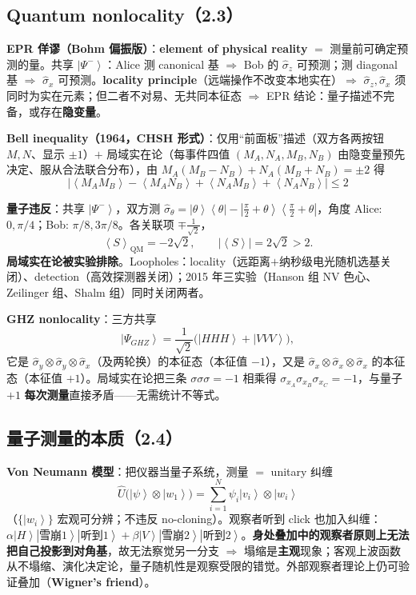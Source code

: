 \documentclass[11pt]{ctexart}
\newcommand{\ket}[1]{\left|#1\right\rangle}
\newcommand{\bra}[1]{\left\langle#1\right|}
\newcommand{\ev}[1]{\left\langle#1\right\rangle}
\newcommand{\op}[1]{\hat{#1}}
\begin{document}
\subsection{Quantum nonlocality（2.3）}

\textbf{EPR 佯谬（Bohm 偏振版）}：\textbf{element of physical reality} $=$ 测量前可确定预测的量。共享 $\ket{\Psi^-}$：Alice 测 canonical 基 $\Rightarrow$ Bob 的 $\op\sigma_z$ 可预测；测 diagonal 基 $\Rightarrow$ $\op\sigma_x$ 可预测。\textbf{locality principle}（远端操作不改变本地实在）$\Rightarrow$ $\op\sigma_z,\op\sigma_x$ 须同时为实在元素；但二者不对易、无共同本征态 $\Rightarrow$ EPR 结论：量子描述不完备，或存在\textbf{隐变量}。

\textbf{Bell inequality（1964，CHSH 形式）}：仅用``前面板''描述（双方各两按钮 $M,N$、显示 $\pm1$）$+$ 局域实在论（每事件四值 $(M_A,N_A,M_B,N_B)$ 由隐变量预先决定、服从合法联合分布），由 $M_A(M_B-N_B)+N_A(M_B+N_B)=\pm2$ 得
\[
\boxed{\;\big|\ev{M_AM_B}-\ev{M_AN_B}+\ev{N_AM_B}+\ev{N_AN_B}\big|\le2\;}
\]

\textbf{量子违反}：共享 $\ket{\Psi^-}$，双方测 $\op\sigma_\theta=\ket\theta\bra\theta-\ket{\tfrac\pi2+\theta}\bra{\tfrac\pi2+\theta}$，角度 Alice: $0,\pi/4$；Bob: $\pi/8,3\pi/8$。各关联项 $\mp\tfrac{1}{\sqrt2}$，
\[
\ev S_{\mathrm{QM}}=-2\sqrt2,\qquad |\ev S|=2\sqrt2>2.
\]
\textbf{局域实在论被实验排除}。Loopholes：locality（远距离$+$纳秒级电光随机选基关闭）、detection（高效探测器关闭）；2015 年三实验（Hanson 组 NV 色心、Zeilinger 组、Shalm 组）同时关闭两者。

\textbf{GHZ nonlocality}：三方共享
\[
\ket{\Psi_{GHZ}}=\frac{1}{\sqrt2}\big(\ket{HHH}+\ket{VVV}\big),
\]
它是 $\op\sigma_y\otimes\op\sigma_y\otimes\op\sigma_x$（及两轮换）的本征态（本征值 $-1$），又是 $\op\sigma_x\otimes\op\sigma_x\otimes\op\sigma_x$ 的本征态（本征值 $+1$）。局域实在论把三条 $\sigma\sigma\sigma=-1$ 相乘得 $\sigma_{x_A}\sigma_{x_B}\sigma_{x_C}=-1$，与量子 $+1$ \textbf{每次测量}直接矛盾——无需统计不等式。

\subsection{量子测量的本质（2.4）}

\textbf{Von Neumann 模型}：把仪器当量子系统，测量 $=$ unitary 纠缠
\[
\op U\big(\ket\psi\otimes\ket{w_1}\big)=\sum_{i=1}^N\psi_i\ket{v_i}\otimes\ket{w_i}
\]
（$\{\ket{w_i}\}$ 宏观可分辨；不违反 no-cloning）。观察者听到 click 也加入纠缠：$\alpha\ket H\ket{\text{雪崩1}}\ket{\text{听到1}}+\beta\ket V\ket{\text{雪崩2}}\ket{\text{听到2}}$。\textbf{身处叠加中的观察者原则上无法把自己投影到对角基}，故无法察觉另一分支 $\Rightarrow$ 塌缩是\textbf{主观}现象；客观上波函数从不塌缩、演化决定论，量子随机性是观察受限的错觉。外部观察者理论上仍可验证叠加（\textbf{Wigner's friend}）。
\end{document}
